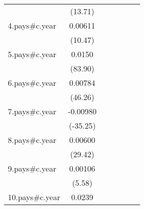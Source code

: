 {\begin{tabular}{l*{6}{c}}
                    &     (13.71)         &                     &                     &                     &                     &                     \\
[1em]
4.pays#c.year       &     0.00611\sym{***}&                     &                     &                     &                     &                     \\
                    &     (10.47)         &                     &                     &                     &                     &                     \\
[1em]
5.pays#c.year       &      0.0150\sym{***}&                     &                     &                     &                     &                     \\
                    &     (83.90)         &                     &                     &                     &                     &                     \\
[1em]
6.pays#c.year       &     0.00784\sym{***}&                     &                     &                     &                     &                     \\
                    &     (46.26)         &                     &                     &                     &                     &                     \\
[1em]
7.pays#c.year       &    -0.00980\sym{***}&                     &                     &                     &                     &                     \\
                    &    (-35.25)         &                     &                     &                     &                     &                     \\
[1em]
8.pays#c.year       &     0.00600\sym{***}&                     &                     &                     &                     &                     \\
                    &     (29.42)         &                     &                     &                     &                     &                     \\
[1em]
9.pays#c.year       &     0.00106\sym{***}&                     &                     &                     &                     &                     \\
                    &      (5.58)         &                     &                     &                     &                     &                     \\
[1em]
10.pays#c.year      &      0.0239\sym{***}&                     &                     &                     &                     &                     \\

\end{tabular}}
